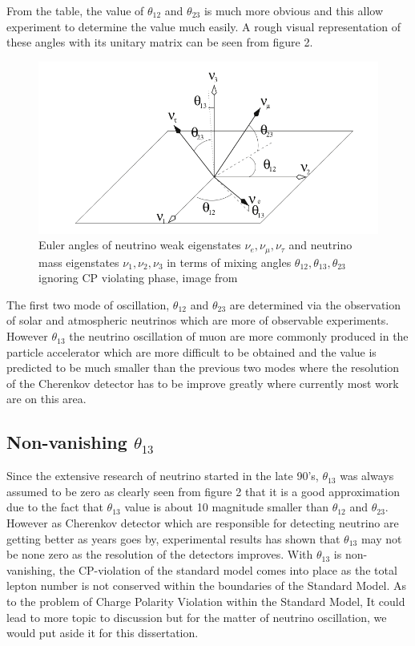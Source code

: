 \documentclass[11pt ,a4paper]{article}
\begin{document}
From the table, the value of \(\theta_{12} \) and \(\theta_{23} \) is much more obvious and this allow experiment to determine the value much easily. A rough visual representation of these angles with its unitary matrix can be seen from figure 2.
\begin{figure}[htbp]
\begin{center}
\includegraphics{theta.png}
\caption{Euler angles of neutrino weak eigenstates \(\nu_e, \nu_{\mu}, \nu_{\tau} \)  and neutrino mass eigenstates \(\nu_1, \nu_2, \nu_3 \) in terms of mixing angles \(\theta_{12}, \theta_{13}, \theta_{23} \) ignoring CP violating phase, image from\cite{massmodel}}
\label{default}
\end{center}
\end{figure}

The first two mode of oscillation, \(\theta_{12} \) and \(\theta_{23} \) are determined via the observation of solar and atmospheric neutrinos which are more of observable experiments. However \(\theta_{13} \) the neutrino oscillation of muon are more commonly produced in the particle accelerator\cite{kamiokande} which are more difficult to be obtained and the value is predicted to be much smaller than the previous two modes where the resolution of the Cherenkov detector has to be improve greatly where currently most work are on this area.
\subsection*{Non-vanishing \(\theta_{13} \)}
Since the extensive research of neutrino started in the late 90's, \(\theta_{13} \) was always assumed to be zero as clearly seen from figure 2 that it is a good approximation due to the fact that \(\theta_{13} \) value is about 10 magnitude smaller than \(\theta_{12} \) and \(\theta_{23} \). However as Cherenkov detector which are responsible for detecting neutrino are getting better as years goes by, experimental results has shown that \(\theta_{13} \) may not be none zero as the resolution of the detectors improves. With \(\theta_{13} \) is non-vanishing, the CP-violation of the standard model comes into place as the total lepton number is not conserved within the boundaries of the Standard Model. As to the problem of Charge Polarity Violation within the Standard Model, It could lead to more topic to discussion but for the matter of neutrino oscillation, we would put aside it for this dissertation.\cite{theta130}\cite{global fit}
\end{document}
